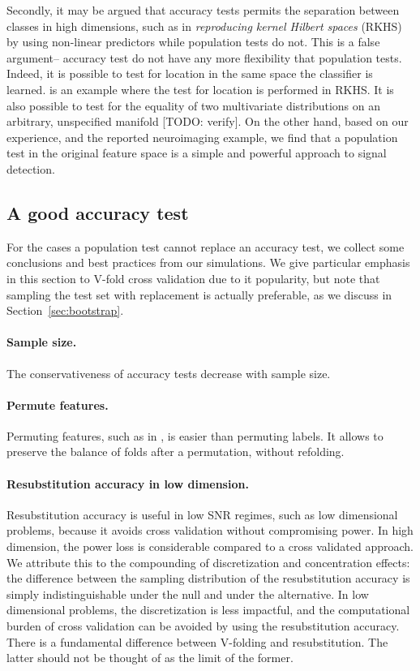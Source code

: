 \documentclass[12pt,a4paper]{article}
\theoremstyle{definition}
\begin{document}
Secondly, it may be argued that accuracy tests permits the separation between classes in high dimensions, such as in \emph{reproducing kernel Hilbert spaces} (RKHS) by using non-linear predictors while population tests do not. 
This is a false argument-- accuracy test do not have any more flexibility that population tests. 
Indeed, it is possible to test for location in the same space the classifier is learned. 
\citet{gretton_kernel_2012-1} is an example where the test for location is performed in RKHS.
It is also possible to test for the equality of two multivariate distributions on an arbitrary, unspecified manifold \citep[e.g.][]{heller_consistent_2013}[TODO: verify].
On the other hand, based on our experience, and the reported neuroimaging example, we find that a population test in the original feature space is a simple and powerful approach to signal detection.







\subsection{A good accuracy test}
For the cases a population test cannot replace an accuracy test, we collect some conclusions and best practices from our simulations.
We give particular emphasis in this section to V-fold cross validation due to it popularity, but note that sampling the test set with replacement is actually preferable, as we discuss in Section~\ref{sec:bootstrap}.

\paragraph{Sample size.} The conservativeness of accuracy tests decrease with sample size. 

\paragraph{Permute features.} Permuting features, such as in \cite{golland_permutation_2005}, is easier than permuting labels. 
It allows to preserve the balance of folds after a permutation, without refolding.

\paragraph{Resubstitution accuracy in low dimension.} Resubstitution accuracy is useful in low SNR regimes, such as low dimensional problems, because it avoids cross validation without compromising power. 
In high dimension, the power loss is considerable compared to a cross validated approach. 
We attribute this to the compounding of discretization and concentration effects: the difference between the sampling distribution of the resubstitution accuracy is simply indistinguishable under the null and under the alternative. 
In low dimensional problems, the discretization is less impactful, and the computational burden of cross validation can be avoided by using the resubstitution accuracy. 
There is a fundamental difference between V-folding and resubstitution. The latter should not be thought of as the limit of the former. 
\end{document}
